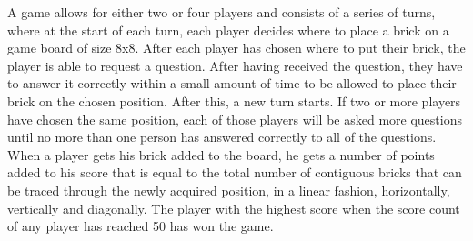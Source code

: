 A game allows for either two or four players and consists of a series of turns, where at the start of each turn, each player decides where to place a brick on a game board of size 8x8. 
After each player has chosen where to put their brick, the player is able to request a question. After having received the question, they have to answer it correctly within a small amount of time to be allowed to place their brick on the chosen position. After this, a new turn starts. If two or more players have chosen the same position, each of those players will be asked more questions until no more than one person has answered correctly to all of the questions. When a player gets his brick added to the board, he gets a number of points added to his score that is equal to the total number of contiguous bricks that can be traced through the newly acquired position, in a linear fashion, horizontally, vertically and diagonally. The player with the highest score when the score count of any player has reached 50 has won the game.
